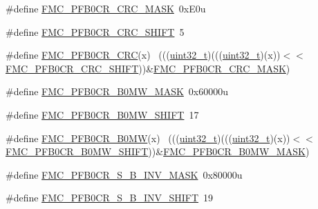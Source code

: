 \begin{DoxyCompactItemize}
\item 
\#define \hyperlink{group___f_m_c___register___masks_ga2ba15c609c4ff7e43ed4d6119b704ddd}{F\+M\+C\+\_\+\+P\+F\+B0\+C\+R\+\_\+\+C\+R\+C\+\_\+\+M\+A\+SK}~0x\+E0u
\item 
\#define \hyperlink{group___f_m_c___register___masks_ga45e4e9c3fff1241f2d1fffa05825efc8}{F\+M\+C\+\_\+\+P\+F\+B0\+C\+R\+\_\+\+C\+R\+C\+\_\+\+S\+H\+I\+FT}~5
\item 
\#define \hyperlink{group___f_m_c___register___masks_ga8afa628555e68cad80bdb5cec8f46a27}{F\+M\+C\+\_\+\+P\+F\+B0\+C\+R\+\_\+\+C\+RC}(x)                                            ~(((\hyperlink{_p_e___types_8h_a33594304e786b158f3fb30289278f5af}{uint32\+\_\+t})(((\hyperlink{_p_e___types_8h_a33594304e786b158f3fb30289278f5af}{uint32\+\_\+t})(x))$<$$<$\hyperlink{group___f_m_c___register___masks_ga45e4e9c3fff1241f2d1fffa05825efc8}{F\+M\+C\+\_\+\+P\+F\+B0\+C\+R\+\_\+\+C\+R\+C\+\_\+\+S\+H\+I\+FT}))\&\hyperlink{group___f_m_c___register___masks_ga2ba15c609c4ff7e43ed4d6119b704ddd}{F\+M\+C\+\_\+\+P\+F\+B0\+C\+R\+\_\+\+C\+R\+C\+\_\+\+M\+A\+SK})
\item 
\#define \hyperlink{group___f_m_c___register___masks_gac03a4c507c37a0a18312d87c64e1ec5d}{F\+M\+C\+\_\+\+P\+F\+B0\+C\+R\+\_\+\+B0\+M\+W\+\_\+\+M\+A\+SK}~0x60000u
\item 
\#define \hyperlink{group___f_m_c___register___masks_gacfb3dd701c01e307d578e1fd0d048149}{F\+M\+C\+\_\+\+P\+F\+B0\+C\+R\+\_\+\+B0\+M\+W\+\_\+\+S\+H\+I\+FT}~17
\item 
\#define \hyperlink{group___f_m_c___register___masks_ga155841881308b676667566bc8d9be324}{F\+M\+C\+\_\+\+P\+F\+B0\+C\+R\+\_\+\+B0\+MW}(x)                                          ~(((\hyperlink{_p_e___types_8h_a33594304e786b158f3fb30289278f5af}{uint32\+\_\+t})(((\hyperlink{_p_e___types_8h_a33594304e786b158f3fb30289278f5af}{uint32\+\_\+t})(x))$<$$<$\hyperlink{group___f_m_c___register___masks_gacfb3dd701c01e307d578e1fd0d048149}{F\+M\+C\+\_\+\+P\+F\+B0\+C\+R\+\_\+\+B0\+M\+W\+\_\+\+S\+H\+I\+FT}))\&\hyperlink{group___f_m_c___register___masks_gac03a4c507c37a0a18312d87c64e1ec5d}{F\+M\+C\+\_\+\+P\+F\+B0\+C\+R\+\_\+\+B0\+M\+W\+\_\+\+M\+A\+SK})
\item 
\#define \hyperlink{group___f_m_c___register___masks_ga74a064f6c3eaf054162fde2404485904}{F\+M\+C\+\_\+\+P\+F\+B0\+C\+R\+\_\+\+S\+\_\+\+B\+\_\+\+I\+N\+V\+\_\+\+M\+A\+SK}~0x80000u
\item 
\#define \hyperlink{group___f_m_c___register___masks_gaa086ecdb24a1217c39116b73aca5ac4f}{F\+M\+C\+\_\+\+P\+F\+B0\+C\+R\+\_\+\+S\+\_\+\+B\+\_\+\+I\+N\+V\+\_\+\+S\+H\+I\+FT}~19

\end{DoxyCompactItemize}
